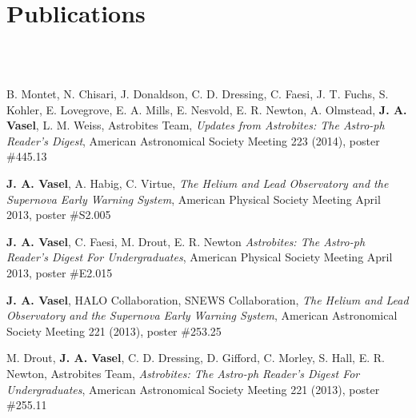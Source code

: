 \documentclass{cv}
\begin{document}
\begin{resume}
 \hfill \date{17 December 2010} \\
\itemSep

 \hfill \date{19 November 2009} \\
 \\


\newpage

\section{Publications}

 \hfill \date{15 August 2013} \\
  \\
\itemSep

B. Montet, N. Chisari, J. Donaldson, C. D. Dressing, C. Faesi, J. T. Fuchs, S. Kohler, E. Lovegrove, E. A. Mills, E. Nesvold, E. R. Newton, A. Olmstead, \textbf{J. A. Vasel}, L. M. Weiss, Astrobites Team, \emph{Updates from Astrobites: The Astro-ph Reader's Digest}, American Astronomical Society Meeting 223 (2014), poster \#445.13
\itemSep

\textbf{J. A. Vasel}, A. Habig, C. Virtue, \emph{The Helium and Lead Observatory and the Supernova Early Warning System}, American Physical Society Meeting April 2013, poster \#S2.005

\textbf{J. A. Vasel}, C. Faesi, M. Drout, E. R. Newton \emph{Astrobites: The Astro-ph Reader's Digest For Undergraduates}, American Physical Society Meeting April 2013, poster \#E2.015

\textbf{J. A. Vasel}, HALO Collaboration, SNEWS Collaboration, \emph{The Helium and Lead Observatory and the Supernova Early Warning System}, American Astronomical Society Meeting 221 (2013), poster \#253.25

M. Drout, \textbf{J. A. Vasel}, C. D. Dressing, D. Gifford, C. Morley, S. Hall, E. R. Newton, Astrobites Team, \emph{Astrobites: The Astro-ph Reader's Digest For Undergraduates}, American Astronomical Society Meeting 221 (2013), poster \#255.11


\end{resume}
\end{document}
